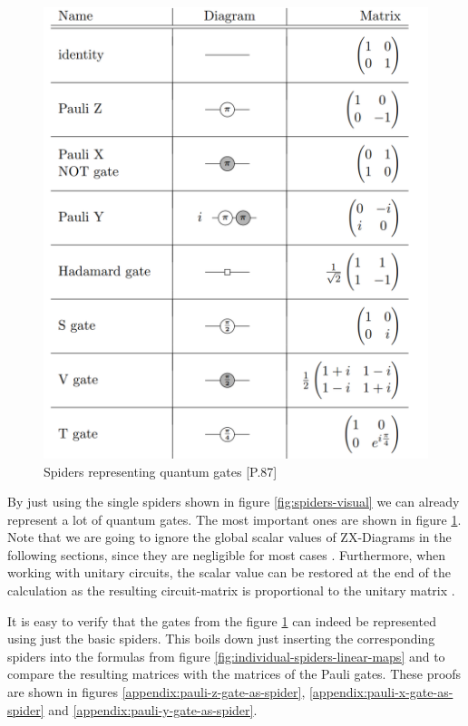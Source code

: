 \begin{figure}
    \includegraphics[width=\linewidth]{images/single_spider_unitaries.png}
    \caption{Spiders representing quantum gates
            {\cite{vandewetering2020zxcalculus}[P.87]}}
    \label{fig:spiders-gate-representation}
\end{figure}



By just using the single spiders shown in figure \ref{fig:spiders-visual} we can already represent a lot of quantum gates. The most important ones are shown in figure \ref{fig:spiders-gate-representation}. Note that we are going to ignore the global scalar values of ZX-Diagrams in the following sections, since they are negligible for most cases \cite{equivalence_checking_tum}. Furthermore, when working with unitary circuits, the scalar value can be restored at the end of the calculation as the resulting circuit-matrix is proportional to the unitary matrix \cite{vandewetering2020zxcalculus}.


It is easy to verify that the gates from the figure \ref{fig:spiders-gate-representation} can indeed be represented using just the basic spiders. This boils down just inserting the corresponding spiders into the formulas from figure \ref{fig:individual-spiders-linear-maps} and to compare the resulting matrices with the matrices of the Pauli gates.
These proofs are shown in figures \ref{appendix:pauli-z-gate-as-spider}, \ref{appendix:pauli-x-gate-as-spider} and \ref{appendix:pauli-y-gate-as-spider}.


